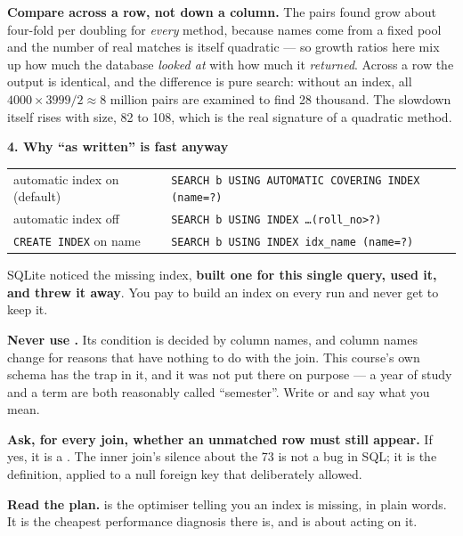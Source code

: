 \begin{measured}
\smallskip
\textbf{Compare across a row, not down a column.} The pairs found grow about
four-fold per doubling for \emph{every} method, because names come from a
fixed pool and the number of real matches is itself quadratic --- so growth
ratios here mix up how much the database \emph{looked at} with how much it
\emph{returned}. Across a row the output is identical, and the difference is
pure search: without an index, all $4000 \times 3999 / 2 \approx 8$ million
pairs are examined to find 28 thousand. The slowdown itself rises with size,
82 to 108, which is the real signature of a quadratic method.

\medskip
\textbf{4. Why ``as written'' is fast anyway}

\begin{tabular}{@{}L{4.8cm}L{9.2cm}@{}}
automatic index on (default) & \texttt{SEARCH b USING AUTOMATIC COVERING INDEX (name=?)} \\
automatic index off & \texttt{SEARCH b USING INDEX \dots (roll\_no>?)} \\
\texttt{CREATE INDEX} on name & \texttt{SEARCH b USING INDEX idx\_name (name=?)} \\
\end{tabular}

\smallskip
SQLite noticed the missing index, \textbf{built one for this single query,
used it, and threw it away}. You pay to build an index on every run and never
get to keep it.
\end{measured}

\begin{alertbox}
\begin{tight}
  \item \textbf{Never use .} Its condition is decided by
        column names, and column names change for reasons that have nothing to
        do with the join. This course's own schema has the trap in it, and it
        was not put there on purpose --- a year of study and a term are both
        reasonably called ``semester''. Write  or  and
        say what you mean.
  \item \textbf{Ask, for every join, whether an unmatched row must still
        appear.} If yes, it is a . The inner join's silence
        about the 73 is not a bug in SQL; it is the definition, applied to a
        null foreign key that  deliberately allowed.
  \item \textbf{Read the plan.}  is the optimiser
        telling you an index is missing, in plain words. It is the cheapest
        performance diagnosis there is, and  is about acting on
        it.
\end{tight}
\end{alertbox}

